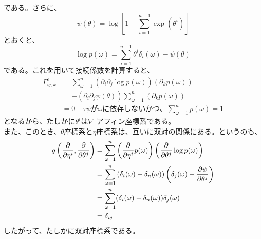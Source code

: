 \documentclass[a4paper,11pt]{jsarticle}
\numberwithin{equation}{section}
\begin{document}
である。さらに、
\begin{equation}
    \psi(\theta) = \log \left[ 1+\sum_{i=1}^{n-1} \exp(\theta^i) \right]
\end{equation}
とおくと、
\begin{equation}
    \log p(\omega) = \sum_{i=1}^{n-1} \theta^i \delta_i(\omega) - \psi(\theta)
\end{equation}
である。これを用いて接続係数を計算すると、
\begin{align}
    \Gamma_{ij,k}^{e} &= \sum_{\omega=1}^{n} (\partial_i \partial_j \log p(\omega)) (\partial_k p(\omega))\\
    &= -(\partial_i \partial_j \psi(\theta)) \sum_{\omega=1}^{n} (\partial_k p(\omega))\\
    &= 0 \quad \because \text{$\psi$が$\omega$に依存しないかつ、$\sum_{\omega=1}^{n} p(\omega) = 1$}
\end{align}
となるから、たしかに$\theta^i$は$\nabla$-アフィン座標系である。\\
また、このとき、$\theta$座標系と$\eta$座標系は、互いに双対の関係にある。というのも、
\begin{align}
    g\left( \pdv{\eta^i},\pdv{\theta^j} \right)
    &= \sum_{\omega=1}^{n} \left( \pdv{\eta^i} p(\omega) \right) \left( \pdv{\theta^j} \log p(\omega) \right)\\
    &= \sum_{\omega=1}^{n} \left( \delta_i(\omega) - \delta_n(\omega) \right) \left( \delta_j(\omega) - \pdv{\psi}{\theta^j} \right)\\
    &= \sum_{\omega=1}^{n} (\delta_i(\omega) - \delta_n(\omega)) \delta_j(\omega) \\
    &= \delta_{ij} 
\end{align}
したがって、たしかに双対座標系である。\\
\end{document}
